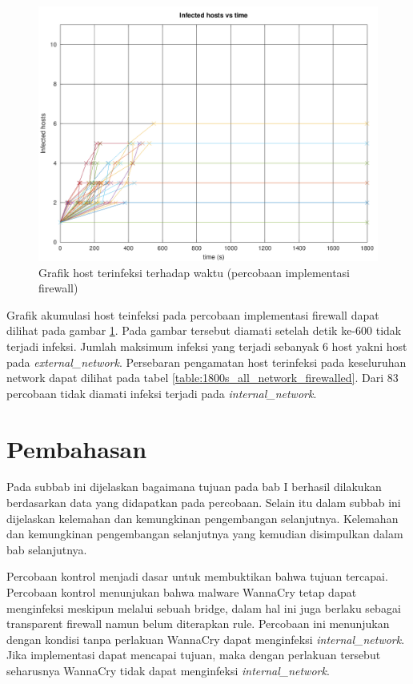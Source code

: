 \begin{figure}[H]
	\centering
	\includegraphics[width=\textwidth]{resources/infection_control_over_time_firewalled.png}
	\caption{Grafik host terinfeksi terhadap waktu (percobaan implementasi firewall)}
	\label{fig:infection_control_over_time_firewalled}
\end{figure}

Grafik akumulasi host teinfeksi pada percobaan implementasi firewall dapat dilihat pada gambar \ref{fig:infection_control_over_time_firewalled}. Pada gambar tersebut diamati setelah detik ke-600 tidak terjadi infeksi. Jumlah maksimum infeksi yang terjadi sebanyak 6 host yakni host pada \textit{external\_network}. Persebaran pengamatan host terinfeksi pada keseluruhan network dapat dilihat pada tabel \ref{table:1800s_all_network_firewalled}. Dari 83 percobaan tidak diamati infeksi terjadi pada \textit{internal\_network}.

\section{Pembahasan}

Pada subbab ini dijelaskan bagaimana tujuan pada bab I berhasil dilakukan berdasarkan data yang didapatkan pada percobaan. Selain itu dalam subbab ini dijelaskan kelemahan dan kemungkinan pengembangan selanjutnya. Kelemahan dan kemungkinan pengembangan selanjutnya yang kemudian disimpulkan dalam bab selanjutnya.

Percobaan kontrol menjadi dasar untuk membuktikan bahwa tujuan tercapai. Percobaan kontrol menunjukan bahwa malware WannaCry tetap dapat menginfeksi meskipun melalui sebuah bridge, dalam hal ini juga berlaku sebagai transparent firewall namun belum diterapkan rule. Percobaan ini menunjukan dengan kondisi tanpa perlakuan WannaCry dapat menginfeksi \textit{internal\_network}. Jika implementasi dapat mencapai tujuan, maka dengan perlakuan tersebut seharusnya WannaCry tidak dapat menginfeksi \textit{internal\_network}.

